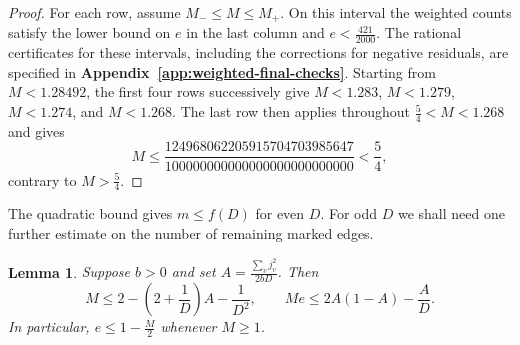 \documentclass[preprint,11pt,numbers]{elsarticle-arxiv}
\numberwithin{equation}{section}
\newtheorem{lemma}[theorem]{Lemma}
\theoremstyle{definition}
\begin{document}
\begin{proof}
For each row, assume $M_-\leq M\leq M_+$. On this interval the
weighted counts satisfy the lower bound on $e$ in the last column
and $e<\frac{421}{2000}$. The rational certificates for these
intervals, including the corrections for negative residuals, are
specified in \textbf{Appendix~\ref{app:weighted-final-checks}}.
Starting from $M<1.28492$, the first four rows successively give
$M<1.283$, $M<1.279$, $M<1.274$, and $M<1.268$. The last row
then applies throughout $\frac54<M<1.268$ and gives
\[
 M\leq\frac{124968062205915704703985647}
                 {100000000000000000000000000}<\frac54,
\]
contrary to $M>\frac54$.
\end{proof}

The quadratic bound gives $m\leq f(D)$ for even $D$. For odd $D$
we shall need one further estimate on the number of remaining marked edges.

\begin{lemma}\label{lem:multi-extra}
Suppose $b>0$ and set $A=\frac{\sum_v j_v^2}{2bD}$. Then
\[
 M\le 2-\left(2+\frac{1}{D}\right)A-\frac{1}{D^2},
 \qquad
 Me\le 2A(1-A)-\frac{A}{D}.
\]
In particular, $e\le 1-\frac{M}{2}$ whenever $M\ge1$.
\end{lemma}
\end{document}
